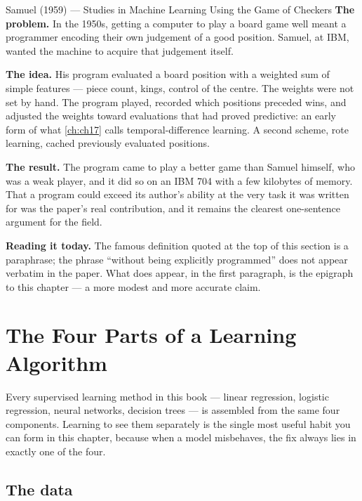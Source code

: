 \begin{researchspotlight}{Samuel (1959) --- Studies in Machine Learning Using the Game of Checkers}
\textbf{The problem.} In the 1950s, getting a computer to play a board game well
meant a programmer encoding their own judgement of a good position. Samuel, at
IBM, wanted the machine to acquire that judgement itself.

\textbf{The idea.} His program evaluated a board position with a weighted sum of
simple features --- piece count, kings, control of the centre. The weights were
not set by hand. The program played, recorded which positions preceded wins, and
adjusted the weights toward evaluations that had proved predictive: an early
form of what \cref{ch:ch17} calls temporal-difference learning. A second scheme,
rote learning, cached previously evaluated positions.

\textbf{The result.} The program came to play a better game than Samuel himself,
who was a weak player, and it did so on an IBM 704 with a few kilobytes of
memory. That a program could exceed its author's ability at the very task it was
written for was the paper's real contribution, and it remains the clearest
one-sentence argument for the field.

\textbf{Reading it today.} The famous definition quoted at the top of this
section is a paraphrase; the phrase ``without being explicitly programmed'' does
not appear verbatim in the paper. What does appear, in the first paragraph, is
the epigraph to this chapter --- a more modest and more accurate claim.
\parencite{samuel1959}
\end{researchspotlight}

\section{The Four Parts of a Learning Algorithm}
\label{sec:four-parts}

Every supervised learning method in this book --- linear regression, logistic
regression, neural networks, decision trees --- is assembled from the same four
components. Learning to see them separately is the single most useful habit you
can form in this chapter, because when a model misbehaves, the fix always lies
in exactly one of the four.

\subsection{The data}

